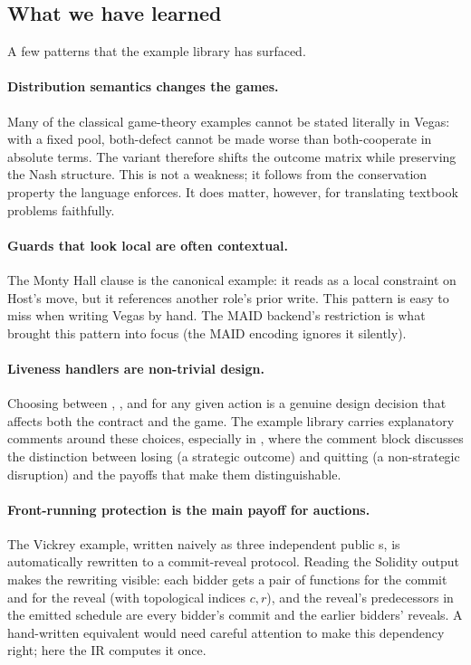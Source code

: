 \subsection{What we have learned}

A few patterns that the example library has surfaced.

\paragraph{Distribution semantics changes the games.}  Many of
the classical game-theory examples cannot be stated literally in
Vegas: with a fixed pool, both-defect cannot be made worse than
both-cooperate in absolute terms.  The 
variant therefore shifts the outcome matrix while preserving the
Nash structure.  This is not a weakness; it follows from the
conservation property the language enforces.  It does matter,
however, for translating textbook problems faithfully.

\paragraph{Guards that look local are often contextual.}  The
Monty Hall  clause is the canonical
example: it reads as a local constraint on Host's move, but it
references another role's prior write.  This pattern is easy to miss when writing Vegas by hand.  The MAID
backend's restriction is what brought this pattern into focus
(the MAID encoding ignores it silently).

\paragraph{Liveness handlers are non-trivial design.}  Choosing
between , , and  for any
given action is a genuine design decision that affects both the
contract and the game.  The example library carries
explanatory comments around these choices, especially in
, where the comment block discusses the
distinction between losing (a strategic outcome) and quitting
(a non-strategic disruption) and the payoffs that make them
distinguishable.

\paragraph{Front-running protection is the main payoff for
auctions.}  The Vickrey example, written naively as three
independent public s, is automatically rewritten to
a commit-reveal protocol.  Reading the Solidity output makes the
rewriting visible: each bidder gets a pair of functions
 for the commit and
 for the reveal
(with topological indices $c, r$), and the reveal's predecessors
in the emitted schedule are every bidder's commit and the earlier
bidders' reveals.  A hand-written equivalent would need careful
attention to make this dependency right; here the IR computes
it once.
